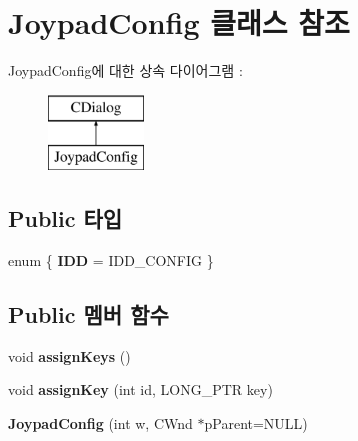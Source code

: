 \hypertarget{class_joypad_config}{}\section{Joypad\+Config 클래스 참조}
\label{class_joypad_config}
Joypad\+Config에 대한 상속 다이어그램 \+: \begin{figure}[H]
\begin{center}
\leavevmode
\includegraphics[height=2.000000cm]{class_joypad_config}
\end{center}
\end{figure}
\subsection*{Public 타입}
\begin{DoxyCompactItemize}
\item 
\mbox{\label{class_joypad_config_a3de60b70a9e5b5a104211e300d388bea}} 
enum \{ {\bfseries I\+DD} = I\+D\+D\+\_\+\+C\+O\+N\+F\+IG
 \}
\end{DoxyCompactItemize}
\subsection*{Public 멤버 함수}
\begin{DoxyCompactItemize}
\item 
\mbox{\label{class_joypad_config_a37ced249f71ab247733787e07085e295}} 
void {\bfseries assign\+Keys} ()
\item 
\mbox{\label{class_joypad_config_a6fe836465dc6d861d96691c03ad0a636}} 
void {\bfseries assign\+Key} (int id, L\+O\+N\+G\+\_\+\+P\+TR key)
\item 
\mbox{\label{class_joypad_config_ade281c386d18c3e9ab2d806cd89ab7ce}} 
{\bfseries Joypad\+Config} (int w, C\+Wnd $\ast$p\+Parent=N\+U\+LL)
\end{DoxyCompactItemize}
